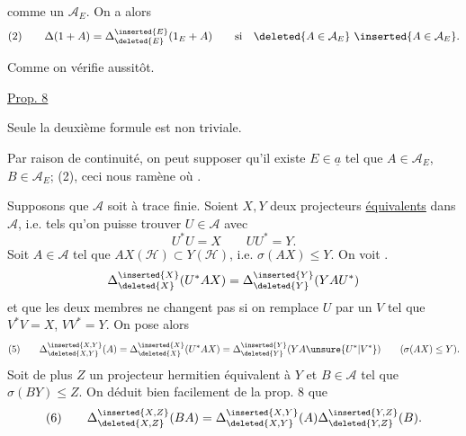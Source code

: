 comme un   $\mathcal A_E$. On a alors
\[
(2)\qquad\Delta(1+A)=\Delta_{\deleted{E}}^{\inserted{E}}(1_E+A)
\qquad\text{si}\quad\deleted{A\in\mathcal A_E}\ \inserted{A\in\mathcal A_E}.
\]


Comme on vérifie aussitôt.

\uline{Prop. 8}
\margin{$\Big|$}

Seule la deuxième formule est non triviale.

Par raison de continuité, on peut supposer qu'il existe $E\in\underline a$ tel que $A\in\mathcal A_E$, $B\in\mathcal A_E$;  (2), ceci nous ramène   où  . 


Supposons  que $\mathcal A$ soit à trace finie. Soient $X,Y$ deux projecteurs  \uline{équivalents} dans $\mathcal A$, i.e. tels qu'on puisse trouver $U\in\mathcal A$ avec
\[
U^*U=X\qquad UU^*=Y.
\]
\margin{$*$}
Soit $A\in\mathcal A$ tel que $AX(\mathcal H)\subset Y(\mathcal H)$, i.e. $\sigma(AX)\leq Y$.  On voit . 
\[
\Delta_{\deleted{X}}^{\inserted{X}}(U^*AX)=\Delta_{\deleted{Y}}^{\inserted{Y}}(YAU^*)
\]
et que les deux membres ne changent pas si on remplace $U$ par un $V$ tel que $V^*V=X$, $VV^*=Y$. On pose alors
\[
(5)\qquad
\Delta_{\deleted{X,Y}}^{\inserted{X,Y}}(A)
=\Delta_{\deleted{X}}^{\inserted{X}}(U^*AX)
=\Delta_{\deleted{Y}}^{\inserted{Y}}(YA\unsure{U^*|V^*})
\qquad(\sigma(AX)\leq Y).
\]
Soit de plus $Z$ un projecteur hermitien équivalent à $Y$ et $B\in\mathcal A$ tel que $\sigma(BY)\leq Z$. On déduit bien facilement de la prop. 8 que
\margin{$=$}
\[
(6)\qquad
\Delta_{\deleted{X,Z}}^{\inserted{X,Z}}(BA)
=\Delta_{\deleted{X,Y}}^{\inserted{X,Y}}(A)
\Delta_{\deleted{Y,Z}}^{\inserted{Y,Z}}(B).
\]
\margin{$=$}

